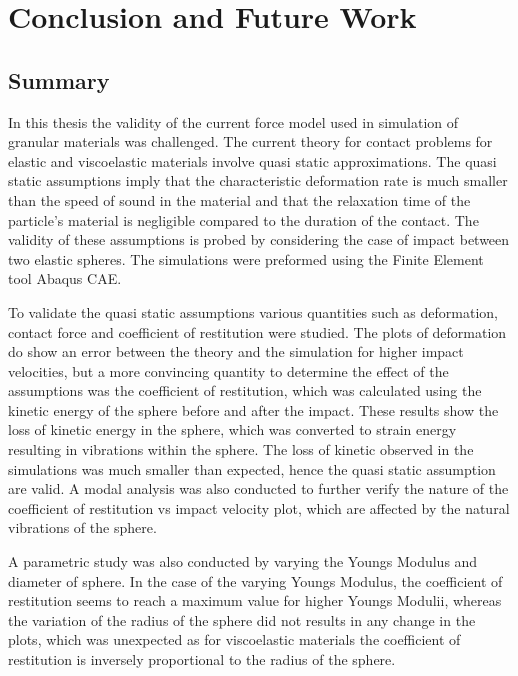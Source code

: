 %
% 


\chapter{Conclusion and Future Work}
\label{sec:conclusion_and_future_work}

\section{Summary}

In this thesis the validity of the current force model used in simulation of granular materials was challenged. The current theory for contact problems for elastic and viscoelastic materials involve quasi static approximations. The quasi static assumptions imply that the characteristic deformation rate is much smaller than the speed of sound in the material and that the relaxation time of the particle's material is negligible compared to the duration of the contact. The validity of these assumptions is probed by considering the case of impact between two elastic spheres. The simulations were preformed using the Finite Element tool Abaqus CAE. 

To validate the quasi static assumptions various quantities such as deformation, contact force and coefficient of restitution were studied. The plots of deformation do show an error between the theory and the simulation for higher impact velocities, but a more convincing quantity to determine the effect of the assumptions was the coefficient of restitution, which was calculated using the kinetic energy of the sphere before and after the impact. These results show the loss of kinetic energy in the sphere, which was converted to strain energy resulting in vibrations within the sphere. The loss of kinetic observed in the simulations was much smaller than expected, hence the quasi static assumption are valid. A modal analysis was also conducted to further verify the nature of the coefficient of restitution vs impact velocity plot, which are affected by the natural vibrations of the sphere. 

A parametric study was also conducted by varying the Youngs Modulus and diameter of sphere. In the case of the varying Youngs Modulus, the coefficient of restitution seems to reach a maximum value for higher Youngs Modulii, whereas the variation of the radius of the sphere did not results in any change in the plots, which was unexpected as for viscoelastic materials the coefficient of restitution is inversely proportional to the radius of the sphere. 



